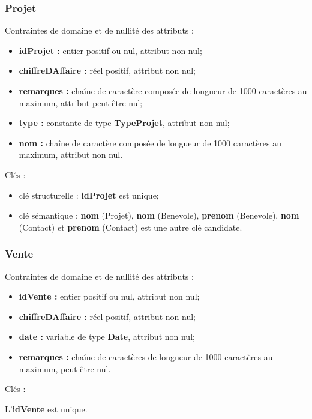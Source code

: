 \subsubsection*{Projet}
Contraintes de domaine et de nullité des attributs :
\begin{itemize}
 	\item \textbf{idProjet :} entier positif ou nul, attribut non nul;
	\item \textbf{chiffreDAffaire :} réel positif, attribut non nul;
	\item \textbf{remarques :} chaîne de caractère composée de longueur de 1000 caractères au maximum, attribut peut être nul;
	\item \textbf{type :} constante de type \textbf{TypeProjet}, attribut non nul;
	\item \textbf{nom :} chaîne de caractère composée de longueur de 1000 caractères au maximum, attribut non nul.\\  
\end{itemize} 

Clés : 
\begin{itemize}
\item clé structurelle : \textbf{idProjet} est unique;
\item clé sémantique : \textbf{nom} (Projet), \textbf{nom} (Benevole), \textbf{prenom} (Benevole), \textbf{nom} (Contact) et \textbf{prenom} (Contact) est une autre clé candidate. \\ 
\end{itemize}

\subsubsection*{Vente}
Contraintes de domaine et de nullité des attributs :
\begin{itemize}
 	\item \textbf{idVente :} entier positif ou nul, attribut non nul;
	\item \textbf{chiffreDAffaire :} réel positif, attribut non nul;
	\item \textbf{date :} variable de type \textbf{Date}, attribut non nul;
	\item \textbf{remarques :} chaîne de caractères de longueur de 1000 caractères au maximum, peut être nul. \\  
\end{itemize} 

Clés : 

L'\textbf{idVente} est unique.\\


